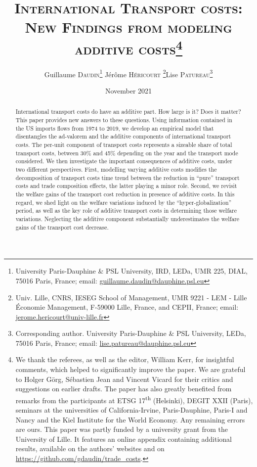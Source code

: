 \documentclass[a4paper,11pt]{article}
\begin{document}
\title{\textsc{International Transport costs:\\New Findings from modeling additive costs}\thanks{We thank the referees, as well as the editor, William Kerr, for insightful comments, which helped to significantly improve the paper. We are grateful to Holger G\"{o}rg, S\'{e}bastien Jean and Vincent Vicard for their critics and suggestions on earlier drafts. The paper has also greatly benefited from remarks from the participants at ETSG 17\textsuperscript{th} (Helsinki), DEGIT XXII (Paris), seminars at the universities of California-Irvine, Paris-Dauphine, Paris-I and Nancy and the Kiel Institute for the World Economy. Any remaining errors are ours. This paper was partly funded by a university grant from the University of Lille. It features an online appendix containing additional results, available on the authors' websites and on \url{https://github.com/gdaudin/trade_costs}.}}

\author{Guillaume \textsc{Daudin}\thanks{%
University Paris-Dauphine \& PSL University, IRD, LEDa, UMR 225, DIAL, 75016 Paris, France; email: \url{guillaume.daudin@dauphine.psl.eu}}  \qquad J\'{e}r\^{o}me \textsc{H\'{e}ricourt} \thanks{Univ. Lille, CNRS, IESEG School of Management, UMR 9221 - LEM - Lille Économie Management, F-59000 Lille, France, and CEPII, France; email: \url{jerome.hericourt@univ-lille.fr}}\qquad Lise \textsc{Patureau}\thanks{Corresponding author.
University Paris-Dauphine \& PSL University, LEDa, 75016 Paris, France;  email: \url{lise.patureau@dauphine.psl.eu} } }


\date{November 2021}
 \maketitle
\bigskip

\begin{abstract}
International transport costs do have an additive part. How large is it? Does it matter? This paper provides new answers to these questions. Using information contained in the US imports flows from 1974 to 2019, we develop an empirical model that disentangles the ad-valorem and the additive components of international transport costs. The per-unit component of transport costs represents a sizeable share of total transport costs, between 30\% and 45\% depending on the year and the transport mode considered. We then investigate the important consequences of additive costs, under two different perspectives. First, modelling varying additive costs modifies the decomposition of transport costs time trend between the reduction in ``pure'' transport costs and trade composition effects, the latter playing a minor role. Second, we revisit the welfare gains of the transport cost reduction in presence of additive costs. In this regard, we shed light on the welfare variations induced by the ``hyper-globalization'' period, as well as the key role of additive transport costs in determining those welfare variations. Neglecting the additive component substantially underestimates the welfare gains of the transport cost decrease.
\end{abstract}
\end{document}
